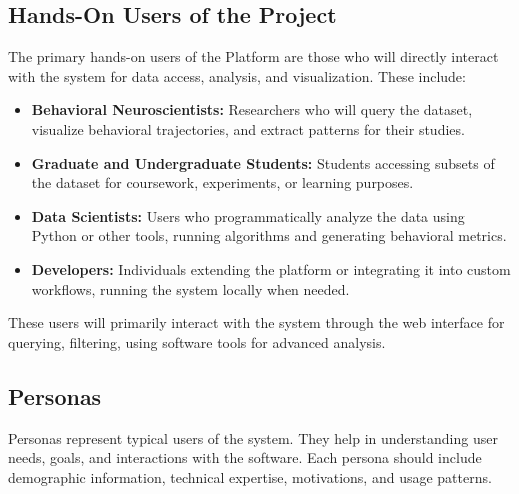 \documentclass[12pt]{article}
\begin{document}
\subsection{Hands-On Users of the Project}
\label{sec:2.4handson}

The primary hands-on users of the Platform are those who will directly interact with the system for data access, analysis, and visualization. These include:

\begin{itemize}
    \item \textbf{Behavioral Neuroscientists:} Researchers who will query the dataset, visualize behavioral trajectories, and extract patterns for their studies.
    \item \textbf{Graduate and Undergraduate Students:} Students accessing subsets of the dataset for coursework, experiments, or learning purposes.
    \item \textbf{Data Scientists:} Users who programmatically analyze the data using Python or other tools, running algorithms and generating behavioral metrics.
    \item \textbf{Developers:} Individuals extending the platform or integrating it into custom workflows, running the system locally when needed.
\end{itemize}

These users will primarily interact with the system through the web interface for querying, filtering, using software tools for advanced analysis. 


\subsection{Personas}

Personas represent typical users of the system. They help in understanding user needs, goals, and interactions with the software. Each persona should include demographic information, technical expertise, motivations, and usage patterns.
\end{document}
